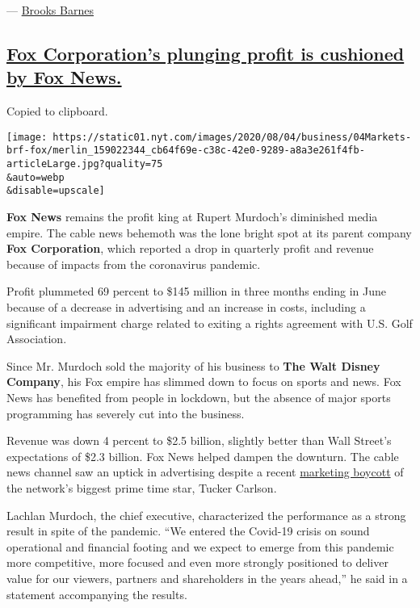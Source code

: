 --- \href{https://www.nytimes.com/by/brooks-barnes}{Brooks Barnes}

\hypertarget{fox-corporations-plunging-profit-is-cushioned-by-fox-news}{%
\subsection{\texorpdfstring{\protect\hyperlink{fox-corporations-plunging-profit-is-cushioned-by-fox-news}{Fox
Corporation's plunging profit is cushioned by Fox
News.}}{Fox Corporation's plunging profit is cushioned by Fox News.}}\label{fox-corporations-plunging-profit-is-cushioned-by-fox-news}}

Copied to clipboard.

\texttt{[image: https://static01.nyt.com/images/2020/08/04/business/04Markets-brf-fox/merlin\_159022344\_cb64f69e-c38c-42e0-9289-a8a3e261f4fb-articleLarge.jpg?quality=75\\\&auto=webp\\\&disable=upscale]}

\textbf{Fox News} remains the profit king at Rupert Murdoch's diminished
media empire. The cable news behemoth was the lone bright spot at its
parent company \textbf{Fox Corporation}, which reported a drop in
quarterly profit and revenue because of impacts from the coronavirus
pandemic.

Profit plummeted 69 percent to \$145 million in three months ending in
June because of a decrease in advertising and an increase in costs,
including a significant impairment charge related to exiting a rights
agreement with U.S. Golf Association.

Since Mr. Murdoch sold the majority of his business to \textbf{The Walt
Disney Company}, his Fox empire has slimmed down to focus on sports and
news. Fox News has benefited from people in lockdown, but the absence of
major sports programming has severely cut into the business.

Revenue was down 4 percent to \$2.5 billion, slightly better than Wall
Street's expectations of \$2.3 billion. Fox News helped dampen the
downturn. The cable news channel saw an uptick in advertising despite a
recent
\href{https://www.nytimes.com/2020/06/18/business/media/tucker-carlson-advertisers-ratings.html}{marketing
boycott} of the network's biggest prime time star, Tucker Carlson.

Lachlan Murdoch, the chief executive, characterized the performance as a
strong result in spite of the pandemic. ``We entered the Covid-19 crisis
on sound operational and financial footing and we expect to emerge from
this pandemic more competitive, more focused and even more strongly
positioned to deliver value for our viewers, partners and shareholders
in the years ahead,'' he said in a statement accompanying the results.

